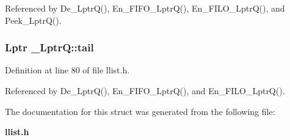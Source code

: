 Referenced by De\_\-Lptr\-Q(), En\_\-FIFO\_\-Lptr\-Q(), En\_\-FILO\_\-Lptr\-Q(), and Peek\_\-Lptr\-Q().
\subsubsection{\setlength{\rightskip}{0pt plus 5cm}\bf{Lptr} \bf{\_\-Lptr\-Q::tail}}\label{struct__LptrQ_52a2e29ff2cc44490f5a6a2893a72a6d}




Definition at line 80 of file llist.h.

Referenced by De\_\-Lptr\-Q(), En\_\-FIFO\_\-Lptr\-Q(), and En\_\-FILO\_\-Lptr\-Q().

The documentation for this struct was generated from the following file:\begin{CompactItemize}
\item 
\bf{llist.h}\end{CompactItemize}
